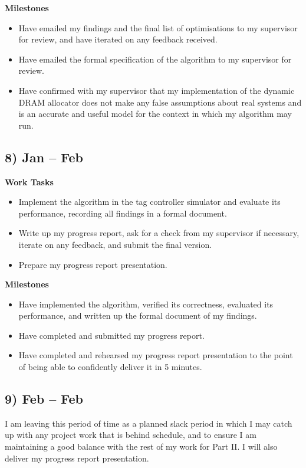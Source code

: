 \documentclass[10pt,a4paper]{article}
\begin{document}
\textbf{Milestones}
\begin{itemize}
	\item Have emailed my findings and the final list of optimisations to my supervisor for review, and have iterated on any feedback received.
	\item Have emailed the formal specification of the algorithm to my supervisor for review.
	\item Have confirmed with my supervisor that my implementation of the dynamic DRAM allocator does not make any false assumptions about real systems and is an accurate and useful model for the context in which my algorithm may run.
\end{itemize}

\subsection*{8)  Jan --  Feb}
\textbf{Work Tasks}
\begin{itemize}
	\item Implement the algorithm in the tag controller simulator and evaluate its performance, recording all findings in a formal document.
	\item Write up my progress report, ask for a check from my supervisor if necessary, iterate on any feedback, and submit the final version.
	\item Prepare my progress report presentation.
\end{itemize}

\textbf{Milestones}
\begin{itemize}
	\item Have implemented the algorithm, verified its correctness, evaluated its performance, and written up the formal document of my findings.
	\item Have completed and submitted my progress report.
	\item Have completed and rehearsed my progress report presentation to the point of being able to confidently deliver it in 5 minutes.
\end{itemize}

\subsection*{9)  Feb --  Feb}
I am leaving this period of time as a planned slack period in which I may catch up with any project work that is behind schedule, and to ensure I am maintaining a good balance with the rest of my work for Part II. I will also deliver my progress report presentation.
\end{document}

